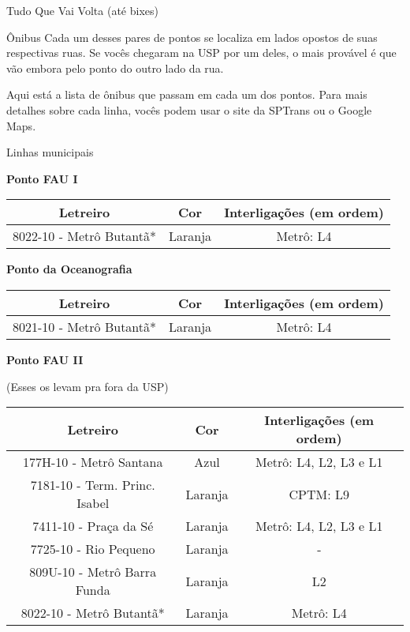 \begin{secao}{Tudo Que Vai Volta (até bixes)}
\begin{subsecao}{Ônibus}
Cada um desses pares de pontos se localiza em lados opostos de suas respectivas
ruas. Se vocês chegaram na USP por um deles, o mais provável é que vão embora pelo
ponto do outro lado da rua.

Aqui está a lista de ônibus que passam em cada um dos pontos. Para mais detalhes
sobre cada linha, vocês podem usar o site da SPTrans ou o Google Maps.

\begin{subsubsecao}{Linhas municipais}

{\bf Ponto FAU I}

\begin{center}
	\begin{tabular}{|c|c|c|}
      \hline
	  Letreiro & Cor & Interligações (em ordem)\\
	  \hline
	  8022-10 - Metrô Butantã* & Laranja & Metrô: L4\\
      \hline
	\end{tabular}
\end{center}

{\bf Ponto da Oceanografia}

\begin{center}
	\begin{tabular}{|c|c|c|}
      \hline
	  Letreiro & Cor & Interligações (em ordem)\\
	  \hline
	  8021-10 - Metrô Butantã* & Laranja & Metrô: L4\\
      \hline
	\end{tabular}
\end{center}

{\bf Ponto FAU II}

(Esses os levam pra fora da USP)
\begin{center}
	\begin{tabular}{|c|c|c|}
      \hline
	  Letreiro & Cor & Interligações (em ordem)\\
	  \hline
	  177H-10 - Metrô Santana & Azul & Metrô: L4, L2, L3 e L1\\
	  7181-10 - Term. Princ. Isabel & Laranja & CPTM: L9\\
	  7411-10 - Praça da Sé & Laranja & Metrô: L4, L2, L3 e L1\\
	  7725-10 - Rio Pequeno & Laranja & - \\
	  809U-10 - Metrô Barra Funda & Laranja & L2 \\
	  8022-10 - Metrô Butantã* & Laranja & Metrô: L4\\
      \hline
	\end{tabular}
\end{center}


\end{subsubsecao}
\end{subsecao}
\end{secao}
